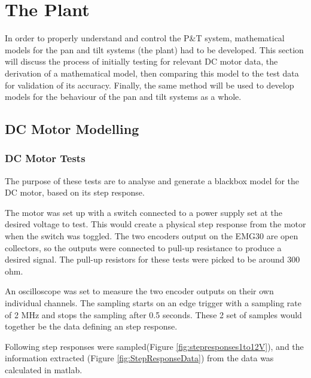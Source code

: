 \section{The Plant}
In order to properly understand and control the P\&T system, mathematical models for the pan and tilt systems (the plant) had to be developed. This section will discuss the process of initially testing for relevant DC motor data, the derivation of a mathematical model, then comparing this  model to the test data for validation of its accuracy. Finally, the same method will be used to develop models for the behaviour of the pan and tilt systems as a whole.

\subsection{DC Motor Modelling}
\subsubsection{DC Motor Tests}
The purpose of these tests are to analyse and generate a blackbox model for the DC motor, based on its step response. 

The motor was set up with a switch connected to a power supply set at the desired voltage to test. This would create a physical step response from the motor when the switch was toggled. The two encoders output on the EMG30 are open collectors, so the outputs were connected to pull-up resistance to produce a desired signal. The pull-up resistors for these tests were picked to be around 300 ohm.

An oscilloscope was set to measure the two encoder outputs on their own individual channels. The sampling starts on an edge trigger with a sampling rate of 2 MHz and stops the sampling after 0.5 seconds.
These 2 set of samples would together be the data defining an step response.

Following step responses were sampled(Figure \ref{fig:stepresponses1to12V}), and the information extracted (Figure \ref{fig:StepResponseData}) from the data was calculated in matlab. 

